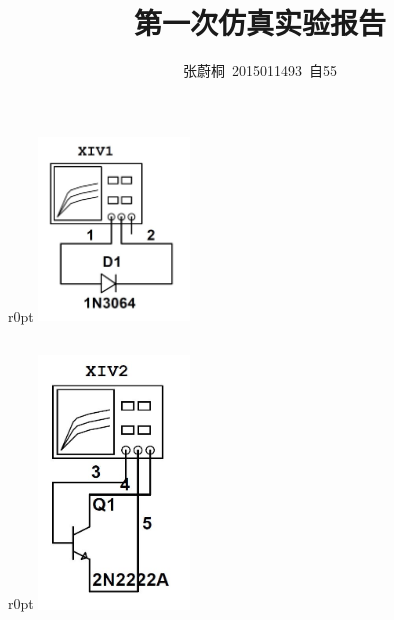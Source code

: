\documentclass[UTF8,a4paper,12pt]{ctexart}
\title{第一次仿真实验报告}
\author{张蔚桐\ 2015011493\ 自55}
\begin{document}
\maketitle
\section{}
\subsection{}

\begin {wrapfigure}{r}{0pt}
\includegraphics [width=40mm]{cap/8.JPG}
\end {wrapfigure}






\subsection{}



\begin {wrapfigure}{r}{0pt}
\includegraphics [width=40mm]{cap/9.JPG}
\end {wrapfigure}



\end{document}
